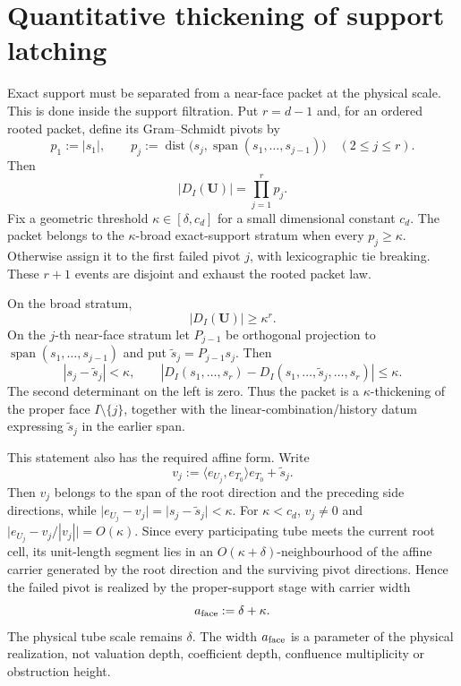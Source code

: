\documentclass[11pt]{article}
\begin{document}
\section{Quantitative thickening of support latching}

Exact support must be separated from a near-face packet at the physical scale.
This is done inside the support filtration.  Put \(r=d-1\) and, for an ordered
rooted packet, define its Gram--Schmidt pivots by
\begin{equation}\label{eq:physical-pivots}
 p_1:=|s_1|,
 \qquad
 p_j:=
 \operatorname{dist}
 \bigl(s_j,\operatorname{span}(s_1,\ldots,s_{j-1})\bigr)
 \quad(2\le j\le r).
\end{equation}
Then
\begin{equation}\label{eq:determinant-pivot-product}
 |D_I(\mathbf U)|=\prod_{j=1}^r p_j.
\end{equation}
Fix a geometric threshold \(\kappa\in[\delta,c_d]\) for a small dimensional
constant \(c_d\).  The packet belongs to the
\(\kappa\)-broad exact-support stratum when every \(p_j\ge\kappa\).  Otherwise
assign it to the first failed pivot \(j\), with lexicographic tie breaking.
These \(r+1\) events are disjoint and exhaust the rooted packet law.

On the broad stratum,
\begin{equation}\label{eq:broad-determinant-floor}
 |D_I(\mathbf U)|\ge\kappa^r.
\end{equation}
On the \(j\)-th near-face stratum let \(P_{j-1}\) be orthogonal projection to
\(\operatorname{span}(s_1,\ldots,s_{j-1})\) and put
\(\widetilde s_j=P_{j-1}s_j\).  Then
\begin{equation}\label{eq:near-face-error}
 |s_j-\widetilde s_j|<\kappa,
 \qquad
 |D_I(s_1,\ldots,s_r)
      -D_I(s_1,\ldots,\widetilde s_j,\ldots,s_r)|
 \le\kappa.
\end{equation}
The second determinant on the left is zero.  Thus the packet is a
\(\kappa\)-thickening of the proper face \(I\setminus\{j\}\), together with the
linear-combination/history datum expressing \(\widetilde s_j\) in the earlier
span.

This statement also has the required affine form.  Write
\[
 v_j:=\langle e_{U_j},e_{T_0}\rangle e_{T_0}+\widetilde s_j.
\]
Then \(v_j\) belongs to the span of the root direction and the preceding side
directions, while
\(\lvert e_{U_j}-v_j\rvert=\lvert s_j-\widetilde s_j\rvert<\kappa\).
For \(\kappa<c_d\), \(v_j\ne0\) and
\(\lvert e_{U_j}-v_j/|v_j|\rvert=O(\kappa)\).  Since every participating tube
meets the current root cell, its unit-length segment lies in an
\(O(\kappa+\delta)\)-neighbourhood of the affine carrier generated by the root
direction and the surviving pivot directions.  Hence the failed pivot is
realized by the proper-support stage with carrier width
\begin{equation}\label{eq:near-face-geometric-scale}
 a_{\rm face}:=\delta+\kappa.
\end{equation}
The physical tube scale remains \(\delta\).  The width \(a_{\rm face}\) is a
parameter of the physical realization, not valuation depth, coefficient depth,
confluence multiplicity or obstruction height.
\end{document}
